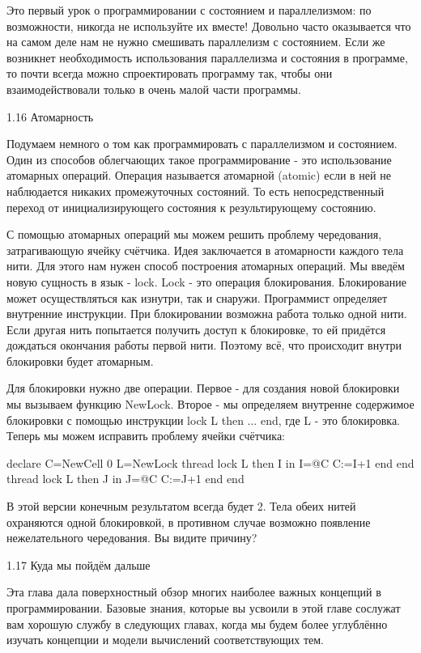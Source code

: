 Это первый урок о программировании с состоянием и параллелизмом: по возможности, никогда не используйте их вместе! Довольно часто оказывается что на самом деле нам не нужно смешивать параллелизм с состоянием. Если же возникнет необходимость использования параллелизма и состояния в программе, то почти всегда можно спроектировать программу так, чтобы они взаимодействовали только в очень малой части программы.

1.16 Атомарность

Подумаем немного о том как программировать с параллелизмом и состоянием. Один из способов облегчающих такое программирование - это использование атомарных операций. Операция называется атомарной (atomic) если в ней не наблюдается никаких промежуточных состояний. То есть непосредственный переход от инициализирующего состояния к результирующему состоянию.

С помощью атомарных операций мы можем решить проблему чередования, затрагивающую ячейку счётчика. Идея заключается в атомарности каждого тела нити. Для этого нам нужен способ построения атомарных операций. Мы введём новую сущность в язык - lock. Lock - это операция блокирования. Блокирование может осуществляться как изнутри, так и снаружи. Программист определяет внутренние инструкции. При блокировании возможна работа только одной нити. Если другая нить попытается получить доступ к блокировке, то ей придётся дождаться окончания работы первой нити. Поэтому всё, что происходит внутри блокировки будет атомарным.

Для блокировки нужно две операции. Первое - для создания новой блокировки мы вызываем функцию NewLock. Второе - мы определяем внутренне содержимое блокировки с помощью инструкции lock L then ... end, где L - это блокировка. Теперь мы можем исправить проблему ячейки счётчика:

declare
C={NewCell 0}
L={NewLock}
thread
lock L then I in
I=@C
C:=I+1
end
end
thread
lock L then J in
J=@C
C:=J+1
end
end

В этой версии конечным результатом всегда будет 2. Тела обеих нитей охраняются одной блокировкой, в противном случае возможно появление нежелательного чередования. Вы видите причину?

1.17 Куда мы пойдём дальше

Эта глава дала поверхностный обзор многих наиболее важных концепций в программировании. Базовые знания, которые вы усвоили в этой главе сослужат вам хорошую службу в следующих главах, когда мы будем более углублённо изучать концепции и модели вычислений соответствующих тем.

